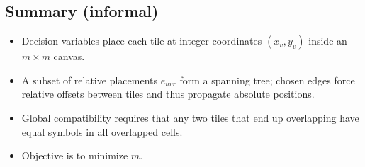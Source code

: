 \documentclass{article}
\begin{document}
\subsection*{Summary (informal)}
\begin{itemize}
  \item Decision variables place each tile at integer coordinates \((x_v,y_v)\) inside an \(m\times m\) canvas.
  \item A subset of relative placements \(e_{uvr}\) form a spanning tree; chosen edges force relative offsets between tiles and thus propagate absolute positions.
  \item Global compatibility requires that any two tiles that end up overlapping have equal symbols in all overlapped cells.
  \item Objective is to minimize \(m\).
\end{itemize}
\end{document}
